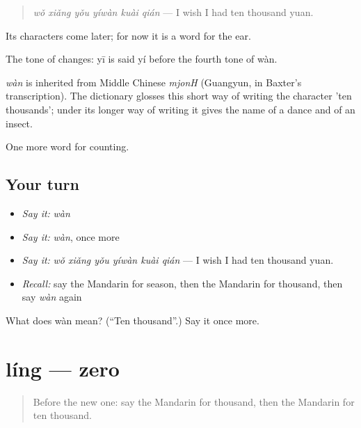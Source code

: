 \begin{quote}
\emph{wǒ xiǎng yǒu yíwàn kuài qián} — I wish I had ten thousand yuan.
\end{quote}

Its characters come later; for now it is a word for the ear.

The tone of  changes: yī is said yí before the fourth tone of wàn.

\begin{cousinweb}
\emph{wàn} is inherited from Middle Chinese \emph{mjonH} (Guangyun, in Baxter's transcription). The dictionary glosses this short way of writing the character 'ten thousands'; under its longer way of writing it gives the name of a dance and of an insect.
\end{cousinweb}

\begin{grammarlens}[title={What you've built}]
One more word for counting.
\end{grammarlens}

\subsection*{Your turn}
\begin{itemize}
\raggedright
  \item \emph{Say it:} \emph{wàn}
  \item \emph{Say it:} \emph{wàn}, once more
  \item \emph{Say it:} \emph{wǒ xiǎng yǒu yíwàn kuài qián} — I wish I had ten thousand yuan.
  \item \emph{Recall:} say the Mandarin for season, then the Mandarin for thousand, then say \emph{wàn} again
\end{itemize}

\begin{tcolorbox}[breakable,colback=teal!4,colframe=teal!35!black,title={Before you move on}]
What does wàn mean? (\textquotedblleft{}Ten thousand\textquotedblright{}.) Say it once more.
\end{tcolorbox}
\section[líng]{líng — zero}

\label{lesson:ZH-C132-ling}



\begin{quote}
Before the new one: say the Mandarin for thousand, then the Mandarin for ten thousand.
\end{quote}

